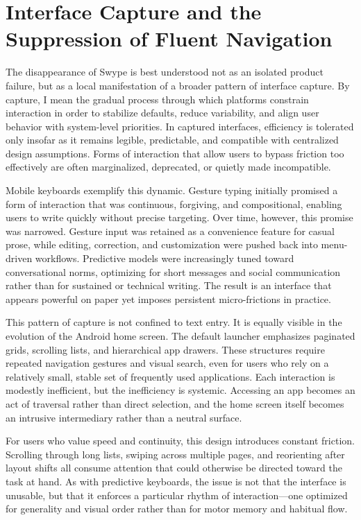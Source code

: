 \documentclass[11pt]{article}
\begin{document}
\section{Interface Capture and the Suppression of Fluent Navigation}

The disappearance of Swype is best understood not as an isolated product failure, but as a local manifestation of a broader pattern of interface capture. By capture, I mean the gradual process through which platforms constrain interaction in order to stabilize defaults, reduce variability, and align user behavior with system-level priorities. In captured interfaces, efficiency is tolerated only insofar as it remains legible, predictable, and compatible with centralized design assumptions. Forms of interaction that allow users to bypass friction too effectively are often marginalized, deprecated, or quietly made incompatible.

Mobile keyboards exemplify this dynamic. Gesture typing initially promised a form of interaction that was continuous, forgiving, and compositional, enabling users to write quickly without precise targeting. Over time, however, this promise was narrowed. Gesture input was retained as a convenience feature for casual prose, while editing, correction, and customization were pushed back into menu-driven workflows. Predictive models were increasingly tuned toward conversational norms, optimizing for short messages and social communication rather than for sustained or technical writing. The result is an interface that appears powerful on paper yet imposes persistent micro-frictions in practice.

This pattern of capture is not confined to text entry. It is equally visible in the evolution of the Android home screen. The default launcher emphasizes paginated grids, scrolling lists, and hierarchical app drawers. These structures require repeated navigation gestures and visual search, even for users who rely on a relatively small, stable set of frequently used applications. Each interaction is modestly inefficient, but the inefficiency is systemic. Accessing an app becomes an act of traversal rather than direct selection, and the home screen itself becomes an intrusive intermediary rather than a neutral surface.

For users who value speed and continuity, this design introduces constant friction. Scrolling through long lists, swiping across multiple pages, and reorienting after layout shifts all consume attention that could otherwise be directed toward the task at hand. As with predictive keyboards, the issue is not that the interface is unusable, but that it enforces a particular rhythm of interaction—one optimized for generality and visual order rather than for motor memory and habitual flow.
\end{document}
